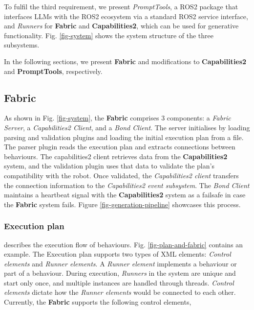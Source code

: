 \documentclass[letterpaper, 10pt, conference]{ieeeconf}      %
\begin{document}
To fulfil the third requirement, we present \textit{PromptTools}, a ROS2 package that interfaces LLMs with the ROS2 ecosystem via a standard ROS2 service interface, and \textit{Runners} for \textbf{Fabric} and \textbf{Capabilities2}, which can be used for generative functionality. Fig. \ref{fig-system} shows the system structure of the three subsystems.

In the following sections, we present \textbf{Fabric} and modifications to \textbf{Capabilities2} and \textbf{PromptTools}, respectively.
    
\subsection{Fabric}

As shown in Fig. \ref{fig-system}, the \textbf{Fabric} comprises 3 components: a \textit{Fabric Server}, a \textit{Capabilities2 Client}, and a \textit{Bond Client}. The server initialises by loading parsing and validation plugins and loading the initial execution plan from a file. The parser plugin reads the execution plan and extracts connections between behaviours. The capabilities2 client retrieves data from the \textbf{Capabilities2} system, and the validation plugin uses that data to validate the plan's compatibility with the robot. Once validated, the \textit{Capabilities2 client} transfers the connection information to the \textit{Capabilities2 event subsystem}. The \textit{Bond Client} maintains a heartbeat signal with the \textbf{Capabilities2} system as a failsafe in case the \textbf{Fabric} system fails. Figure \ref{fig-generation-pipeline} showcases this process.

\subsubsection{Execution plan} describes the execution flow of behaviours. Fig. \ref{fig-plan-and-fabric} contains an example. The Execution plan supports two types of XML elements: \textit{Control elements} and \textit{Runner elements}. A \textit{Runner element} implements a behaviour or part of a behaviour. During execution, \textit{Runners} in the system are unique and start only once, and multiple instances are handled through threads. \textit{Control elements} dictate how the \textit{Runner elements} would be connected to each other. Currently, the \textbf{Fabric} supports the following control elements,
\end{document}
